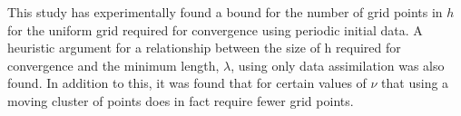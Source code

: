 \documentclass[12pt]{amsart}
\theoremstyle{plain}
\theoremstyle{definition}
\theoremstyle{remark}
\numberwithin{equation}{section} %
\numberwithin{figure}{section}   %
\begin{document}
This study has experimentally found a bound for the number of grid points in $h$ for the uniform grid required for convergence using periodic initial data. A heuristic argument for a relationship between the size of h required for convergence and the minimum length, $\lambda$, using only data assimilation was also found. In addition to this, it was found that for certain values of $\nu$ that using a moving cluster of points does in fact require fewer grid points.




\end{document}
